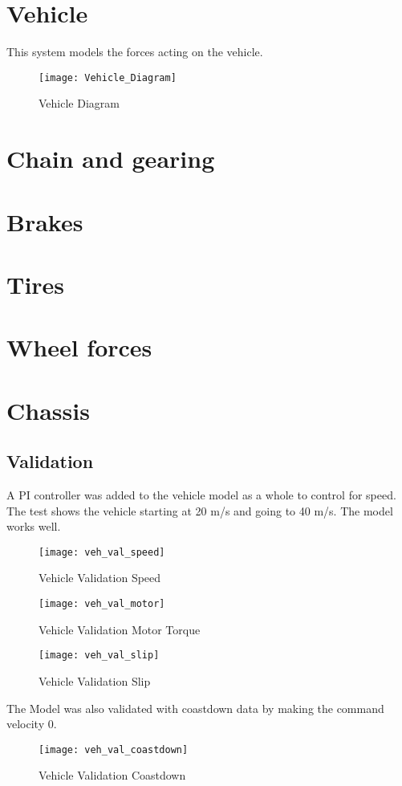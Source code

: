 \documentclass[../SimBALink.tex]{subfiles}
\begin{document}
\section{Vehicle} This system models the forces acting on the vehicle.
\begin{figure}[H]
  \centering
  \texttt{[image: Vehicle\_Diagram]}
  \caption{Vehicle Diagram}
\end{figure}

\section{Chain and gearing}


\section{Brakes}


\section{Tires}


\section{Wheel forces}


\section{Chassis}


\subsection{Validation}
A PI controller was added to the vehicle model as a whole to control for speed. The test shows the vehicle starting at 20 m/s and going to 40 m/s. The model works well.

\begin{figure}[H]
  \centering
  \texttt{[image: veh\_val\_speed]}
  \caption{Vehicle Validation Speed}
\end{figure}

\begin{figure}[H]
  \centering
  \texttt{[image: veh\_val\_motor]}
  \caption{Vehicle Validation Motor Torque}
\end{figure}

\begin{figure}[H]
  \centering
  \texttt{[image: veh\_val\_slip]}
  \caption{Vehicle Validation Slip}
\end{figure}

The Model was also validated with coastdown data by making the command velocity 0.

\begin{figure}[H]
  \centering
  \texttt{[image: veh\_val\_coastdown]}
  \caption{Vehicle Validation Coastdown}
\end{figure}
\end{document}

